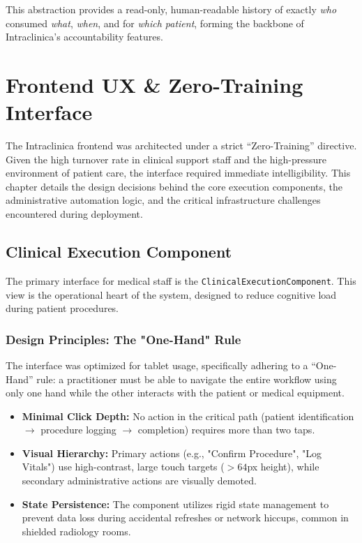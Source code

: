 \documentclass[12pt, openright, twoside, a4paper, english, french, spanish]{abntex2}
\begin{document}
This abstraction provides a read-only, human-readable history of exactly \textit{who} consumed \textit{what}, \textit{when}, and for \textit{which patient}, forming the backbone of Intraclinica's accountability features.

\chapter{Frontend UX \& Zero-Training Interface}
\label{chap:frontend_ux}

The Intraclinica frontend was architected under a strict ``Zero-Training'' directive. Given the high turnover rate in clinical support staff and the high-pressure environment of patient care, the interface required immediate intelligibility. This chapter details the design decisions behind the core execution components, the administrative automation logic, and the critical infrastructure challenges encountered during deployment.

\section{Clinical Execution Component}
\label{sec:clinical_execution}

The primary interface for medical staff is the \texttt{ClinicalExecutionComponent}. This view is the operational heart of the system, designed to reduce cognitive load during patient procedures.

\subsection{Design Principles: The "One-Hand" Rule}
The interface was optimized for tablet usage, specifically adhering to a ``One-Hand'' rule: a practitioner must be able to navigate the entire workflow using only one hand while the other interacts with the patient or medical equipment.

\begin{itemize}
    \item \textbf{Minimal Click Depth:} No action in the critical path (patient identification $\rightarrow$ procedure logging $\rightarrow$ completion) requires more than two taps.
    \item \textbf{Visual Hierarchy:} Primary actions (e.g., "Confirm Procedure", "Log Vitals") use high-contrast, large touch targets ($>64$px height), while secondary administrative actions are visually demoted.
    \item \textbf{State Persistence:} The component utilizes rigid state management to prevent data loss during accidental refreshes or network hiccups, common in shielded radiology rooms.
\end{itemize}
\end{document}
